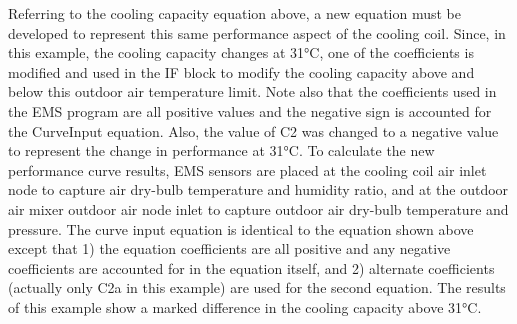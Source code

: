 Referring to the cooling capacity equation above, a new equation must be developed to represent this same performance aspect of the cooling coil. Since, in this example, the cooling capacity changes at 31°C, one of the coefficients is modified and used in the IF block to modify the cooling capacity above and below this outdoor air temperature limit. Note also that the coefficients used in the EMS program are all positive values and the negative sign is accounted for the CurveInput equation. Also, the value of C2 was changed to a negative value to represent the change in performance at 31°C. To calculate the new performance curve results, EMS sensors are placed at the cooling coil air inlet node to capture air dry-bulb temperature and humidity ratio, and at the outdoor air mixer outdoor air node inlet to capture outdoor air dry-bulb temperature and pressure. The curve input equation is identical to the equation shown above except that 1) the equation coefficients are all positive and any negative coefficients are accounted for in the equation itself, and 2) alternate coefficients (actually only C2a in this example) are used for the second equation. The results of this example show a marked difference in the cooling capacity above 31°C.

